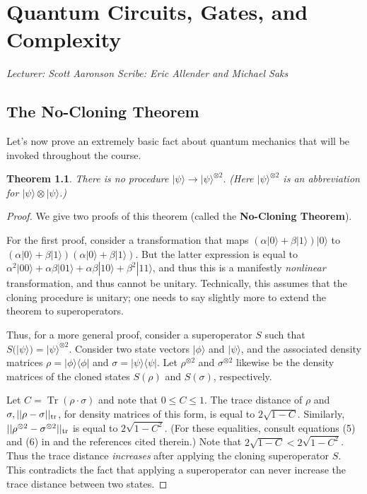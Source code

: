 \documentclass[12pt]{report}
\theoremstyle{plain}
\newtheorem{theorem}{Theorem}[section]
\theoremstyle{definition}
\renewcommand{\ket}[1]{|#1\rangle}
\newcommand{\ketbra}[2]{|#1\rangle\!\langle#2|}
\newcommand{\Tr}{\operatorname{Tr}}
\newcommand{\lecture}[3]{%
  \chapter{#3}%
  \vspace{-5ex}%
  \textit{Lecturer: #1 \hfill Scribe: #2}\par%
  \vspace{1ex}\titlerule\vspace{2ex}}
\begin{document}

\lecture{Scott Aaronson}{Eric Allender and Michael Saks}{Quantum Circuits, Gates, and Complexity}

\section{The No-Cloning Theorem}

Let's now prove an extremely basic fact about quantum mechanics that will be invoked throughout the course.

\begin{theorem}
There is no procedure
$\ket{\psi} \rightarrow \ket{\psi}^{\otimes 2}.$
(Here $\ket{\psi}^{\otimes 2}$ is an abbreviation for $\ket{\psi}\otimes \ket{\psi}$.)
\end{theorem}
\begin{proof}
We give two proofs of this theorem (called the {\bf No-Cloning Theorem}).

For the first proof, consider a transformation that maps
$(\alpha \ket{0} + \beta\ket{1})\ket{0}$
to
$(\alpha \ket{0} + \beta\ket{1}) (\alpha \ket{0} + \beta\ket{1})$.
But the latter expression is equal to
$\alpha^2\ket{00} + \alpha\beta \ket{01} + \alpha\beta\ket{10} + \beta^2 \ket{11}$,
and thus this is a manifestly {\em nonlinear} transformation, and thus cannot
be unitary. Technically, this assumes that the cloning procedure is unitary; one needs to say slightly
more to extend the theorem to superoperators.

Thus, for a more general proof, consider a superoperator $S$ such that
$S(\ket{\psi}) = \ket{\psi}^{\otimes 2}.$  Consider two state vectors
$\ket{\phi}$ and $\ket{\psi}$, and the associated density matrices
$\rho = \ketbra{\phi}{\phi}$ and
$\sigma = \ketbra{\psi}{\psi}$.
Let $\rho^{\otimes 2}$ and $\sigma^{\otimes 2}$ likewise be the density matrices
of the cloned states $S(\rho)$ and $S(\sigma)$, respectively.

Let $C = \Tr(\rho\cdot\sigma)$ and note that $0 \leq C \leq 1$.
The trace distance of
$\rho$ and $\sigma, ||\rho - \sigma||_{\rm tr}$, for density matrices
of this form, is equal to $2\sqrt{1-C}$.  Similarly,
$||\rho^{\otimes 2} - \sigma^{\otimes 2}||_{\rm tr}$ is equal to
$2\sqrt{1-C^2}$.
(For these equalities, consult equations (5) and (6) in
\cite{Maz15} and the references cited
therein.)
Note that $2\sqrt{1-C}< 2\sqrt{1-C^2}$.  Thus the trace distance
{\em increases} after applying the cloning superoperator $S$.
This contradicts the fact that applying a superoperator can never
increase the trace distance between two states.
\end{proof}
\end{document}
